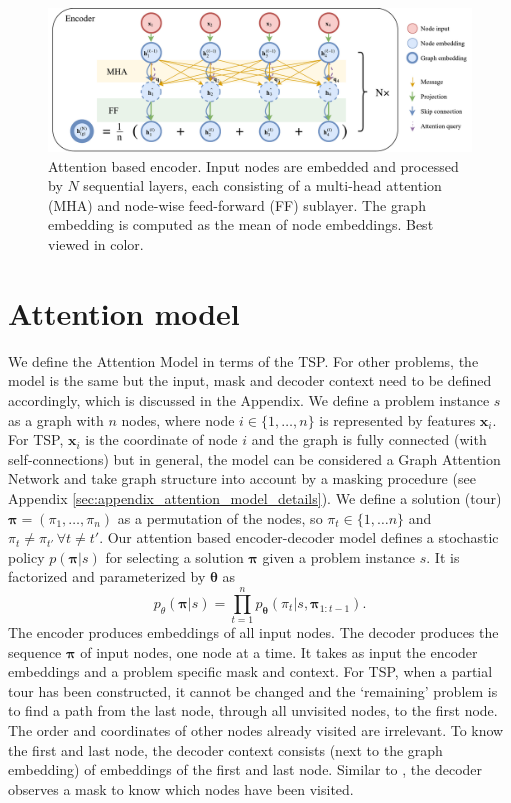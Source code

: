 
\begin{figure}
\vskip -0.18in
\includegraphics[trim={0 1.0 0 0.0},clip,width=1.0\linewidth]{./images/Encoder}
\vskip -0.06in
\caption{Attention based encoder. Input nodes are embedded and processed by $N$ sequential layers, each consisting of a multi-head attention (MHA) and node-wise feed-forward (FF) sublayer. The graph embedding is computed as the mean of node embeddings. Best viewed in color.}
\label{fig:encoder}
\vskip -0.1in
\end{figure}

\section{Attention model}
\label{sec:attention_model}
We define the Attention Model in terms of the TSP. For other problems, the model is the same but the input, mask and decoder context need to be defined accordingly, which is discussed in the Appendix.
We define a problem instance $s$ as a graph with $n$ nodes, where node $i \in \{1, \ldots, n\}$ is represented by features $\mathbf{x}_i$. For TSP, $\mathbf{x}_i$ is the coordinate of node $i$ and the graph is fully connected (with self-connections) but in general, the model can be considered a Graph Attention Network \citep{velickovic2018graph} and take graph structure into account by a masking procedure (see Appendix \ref{sec:appendix_attention_model_details}). We define a solution (tour) $\bm{\pi} = (\pi_1, \ldots, \pi_n)$ as a permutation of the nodes, so $\pi_t \in \{1, \ldots n\}$ and $\pi_t \neq \pi_{t'} \, \forall t \neq t'$.
Our attention based encoder-decoder model defines a stochastic policy $p(\bm{\pi}|s)$ for selecting a solution $\bm{\pi}$ given a problem instance $s$. It is factorized and parameterized by $\bm{\theta}$ as
\begin{equation}
\label{eq:p_model}
	p_\theta(\bm{\pi}|s) = \prod\limits_{t=1}^{n} p_{\bm{\theta}}(\pi_t|s, \bm{\pi}_{1:t-1}).
\end{equation}
The encoder produces embeddings of all input nodes. The decoder produces the sequence $\bm{\pi}$ of input nodes, one node at a time. It takes as input the encoder embeddings and a problem specific mask and context. For TSP, when a partial tour has been constructed, it cannot be changed and the ‘remaining’ problem is to find a path from the last node, through all unvisited nodes, to the first node. The order and coordinates of other nodes already visited are irrelevant. To know the first and last node, the decoder context consists (next to the graph embedding) of embeddings of the first and last node. Similar to \citet{bello2016neural}, the decoder observes a mask to know which nodes have been visited.



